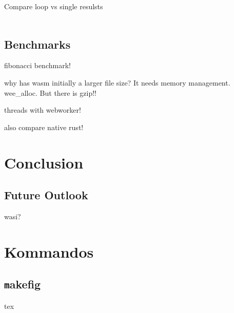 Compare loop vs single resulsts
\\\\

\subsection{Benchmarks}
fibonacci benchmark!

why has wasm initially a larger file size? It needs memory management. wee\_alloc. But there is gzip!! \cite{wasm:allocator, rust:wasmfilesize}

threads with webworker!

also compare native rust!

\section{Conclusion}

\subsection{Future Outlook}
wasi?




\section{Kommandos}\label{sec:Kommandos}
\subsection{\texttt makefig}

\begin{listing}
\begin{code}{tex}
\end{code}
\caption{\texttt makefig}
\label{lst:makefig}
\end{listing}

